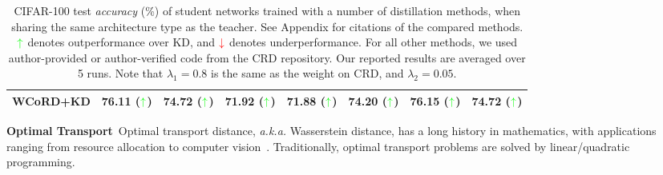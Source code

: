 \documentclass[final]{cvpr}
\theoremstyle{definition}
\newcommand*{\mathcolor}{}
\def\mathcolor#1#{\mathcoloraux{#1}}
\newcommand*{\mathcoloraux}[3]{\protect\leavevmode
  \begingroup
    \color#1{#2}#3\endgroup
}
\begin{document}
\begin{table*}[t!]
\begin{center}
\begin{tabular}{lccccccc}
WCoRD+KD & \textbf{76.11} ($\mathcolor{green}{\uparrow}$)& {74.72} ($\mathcolor{green}{\uparrow}$)& \textbf{71.92} ($\mathcolor{green}{\uparrow}$)& \textbf{71.88} ($\mathcolor{green}{\uparrow}$)& \textbf{74.20} ($\mathcolor{green}{\uparrow}$)& \textbf{76.15} ($\mathcolor{green}{\uparrow}$)& \textbf{74.72} ($\mathcolor{green}{\uparrow}$)\\
\bottomrule
\end{tabular}
\caption{
\small{
CIFAR-100 test \emph{accuracy} (\%) of student networks trained with a number of distillation methods, when sharing the same architecture type as the teacher. See Appendix for citations of the compared methods. $\mathcolor{green}{\uparrow}$ denotes outperformance over KD, and $\mathcolor{red}{\downarrow}$ denotes underperformance. For all other methods, we used author-provided or author-verified code from the CRD repository. Our reported results are averaged over 5 runs. Note that $\lambda_1=0.8$ is the same as the weight on CRD, and $\lambda_2=0.05$.
}}
\label{tb:cifar100_same}
\end{center}
\vspace{-2mm}
\end{table*} 
\begin{table*}[t]
\small


\begin{center}
\caption{
\small{Top-1 and Top-5 error rates (\%) of student network ResNet-18 on ImageNet validation set.}
}
\label{tb:imagenet}
\end{center}
\vspace{-3mm}
\end{table*} 
\vspace{5pt}
\noindent\textbf{Optimal Transport}\,
Optimal transport distance, \emph{a.k.a.} Wasserstein distance, has a long history in mathematics, with applications ranging from resource allocation to computer vision~\cite{rubner1998metric}. Traditionally, optimal transport problems are solved by linear/quadratic programming.
\end{document}
